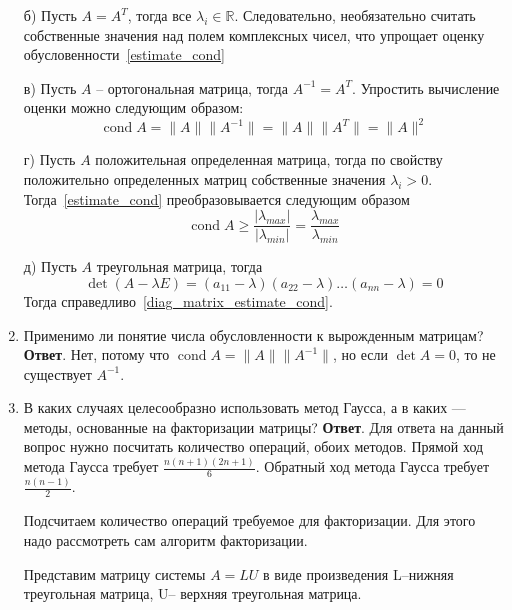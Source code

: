 \documentclass{article}
\newcommand{\cond}{\mathop{\mathrm{cond}}\nolimits}
\begin{document}
\begin{enumerate}
    б) Пусть $A = A^T$, тогда все $\lambda_i \in \mathbb{R}$. Следовательно, 
    необязательно считать собственные значения над полем комплексных чисел, что 
    упрощает оценку обусловенности~\eqref{estimate_cond}

    в) Пусть $A$ -- ортогональная матрица, тогда 
    $A^{-1} = A^T$. Упростить вычисление оценки можно следующим образом:
    \begin{equation*}
      \cond A = \|A\| \|A^{-1}\| = \|A\| \|A^T\| = \|A\|^2
    \end{equation*}

    г) Пусть $A$ положительная определенная матрица, тогда 
    по свойству положительно определенных матриц собственные значения $\lambda_i > 0$.
    Тогда~\eqref{estimate_cond} преобразовывается следующим образом
    \begin{equation*}
      \cond A \geqslant \frac{|\lambda_{max}|}{|\lambda_{min}|} = \frac{\lambda_{max}}{\lambda_{min}}
    \end{equation*}

    д) Пусть $A$ треугольная матрица, тогда 
    \begin{equation*}
      \det (A - \lambda E) = (a_{11} - \lambda) (a_{22} - \lambda) \ldots (a_{nn} - \lambda) = 0
    \end{equation*}
    Тогда справедливо~\eqref{diag_matrix_estimate_cond}.
    \item Применимо ли понятие числа обусловленности к вырожденным матрицам?
    \newline
    {\bfseries Ответ}. Нет, потому что $\cond A = \|A\| \|A^{-1}\|$, но если
    $\det A = 0$, то не существует $A^{-1}$.

    \item В каких случаях целесообразно использовать метод Гаусса,
    а в каких — методы, основанные на факторизации матрицы?
    \newline
    {\bfseries Ответ}.
    Для ответа на данный вопрос нужно посчитать количество операций, обоих методов. Прямой ход метода Гаусса требует $\frac{n(n+1)(2n+1)}{6}$. Обратный ход метода Гаусса требует $\frac{n(n-1)}{2}$.
	
	
	Подсчитаем количество операций требуемое для факторизации. Для этого надо рассмотреть сам алгоритм факторизации.
	
	
	Представим матрицу системы $A = LU$ в виде произведения L--нижняя треугольная матрица, U-- верхняя треугольная матрица.
	

\end{enumerate}
\end{document}
